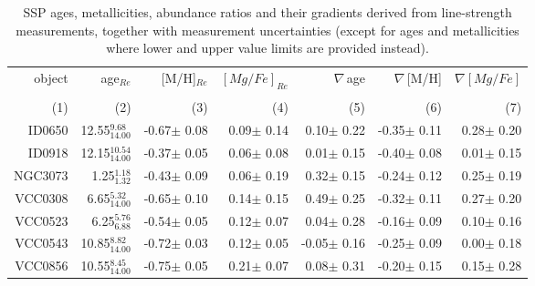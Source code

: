 \documentclass[useAMS,usenatbib]{mn2e}
\begin{document}
\begin{table*}
\caption{SSP ages, metallicities, abundance ratios and their gradients derived from line-strength measurements, together with measurement uncertainties (except for ages and metallicities where lower and upper value limits are provided instead).}
\begin{threeparttable}
\centering
\begin{tabular}{|r|r|r|r|r|r|r|}
\hline
object    &age$_{Re}$    &[M/H]$_{Re}$ &$[Mg/Fe]_{Re}$  &$\nabla$\,age   &$\nabla$\,[M/H]&$\nabla [Mg/Fe]$ \\
          &              &              &                &                &                &                 \\
   (1)    &    (2)       &    (3)       &   (4)          &    (5)         &   (6)          &   (7)           \\
\hline
ID0650 &        12.55$^{       9.68}_{       14.00}$ &     -0.67$\pm$     0.08 &      0.09$\pm$      0.14 &      0.10$\pm$      0.22&     -0.35$\pm$      0.11&      0.28$\pm$      0.20\\
\rule{0pt}{3ex}
ID0918 &        12.15$^{       10.54}_{       14.00}$ &     -0.37$\pm$     0.05 &      0.06$\pm$     0.08 &    0.01$\pm$      0.15&     -0.40$\pm$     0.08&     0.01$\pm$      0.15\\
\rule{0pt}{3ex}
NGC3073 &        1.25$^{       1.18}_{       1.32}$ &     -0.43$\pm$     0.09 &      0.06$\pm$      0.19 &      0.32$\pm$      0.15&     -0.24$\pm$      0.12&      0.25$\pm$      0.19\\
\rule{0pt}{3ex}
VCC0308 &        6.65$^{       5.32}_{       14.00}$ &     -0.65$\pm$     0.10 &       0.14$\pm$      0.15 &      0.49$\pm$      0.25&     -0.32$\pm$      0.11&      0.27$\pm$      0.20\\
\rule{0pt}{3ex}
VCC0523 &        6.25$^{       5.76}_{       6.88}$ &     -0.54$\pm$     0.05 &       0.12$\pm$     0.07 &     0.04$\pm$      0.28&     -0.16$\pm$     0.09&      0.10$\pm$      0.16\\
\rule{0pt}{3ex}
VCC0543 &        10.85$^{       8.82}_{       14.00}$ &     -0.72$\pm$     0.03 &       0.12$\pm$     0.05 &    -0.05$\pm$      0.16&     -0.25$\pm$     0.09&   0.00$\pm$      0.18\\
\rule{0pt}{3ex}
VCC0856 &        10.55$^{       8.45}_{       14.00}$ &     -0.75$\pm$     0.05 &       0.21$\pm$     0.07 &     0.08$\pm$      0.31&     -0.20$\pm$      0.15&      0.15$\pm$      0.28\\

\end{tabular}
\end{threeparttable}
\end{table*}
\end{document}
